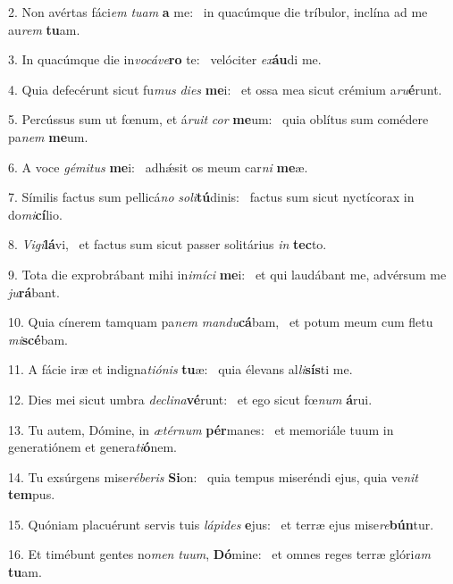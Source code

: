 2. Non avértas fáci\textit{em} \textit{tu}\textit{am} \textbf{a} me: \ast\  in quacúmque die tríbulor, inclína ad me au\textit{rem} \textbf{tu}am.\

3. In quacúmque die in\textit{vo}\textit{cá}\textit{ve}\textbf{ro} te: \ast\  velóciter \textit{ex}\textbf{áu}di me.\

4. Quia defecérunt sicut fu\textit{mus} \textit{di}\textit{es} \textbf{me}i: \ast\  et ossa mea sicut crémium a\textit{ru}\textbf{é}runt.\

5. Percússus sum ut fœnum, et á\textit{ru}\textit{it} \textit{cor} \textbf{me}um: \ast\  quia oblítus sum comédere pa\textit{nem} \textbf{me}um.\

6. A voce \textit{gé}\textit{mi}\textit{tus} \textbf{me}i: \ast\  adhǽsit os meum car\textit{ni} \textbf{me}æ.\

7. Símilis factus sum pellicá\textit{no} \textit{so}\textit{li}\textbf{tú}dinis: \ast\  factus sum sicut nyctícorax in do\textit{mi}\textbf{cí}lio.\

8. \textit{Vi}\textit{gi}\textbf{lá}vi, \ast\  et factus sum sicut passer solitárius \textit{in} \textbf{tec}to.\

9. Tota die exprobrábant mihi in\textit{i}\textit{mí}\textit{ci} \textbf{me}i: \ast\  et qui laudábant me, advérsum me \textit{ju}\textbf{rá}bant.\

10. Quia cínerem tamquam pa\textit{nem} \textit{man}\textit{du}\textbf{cá}bam, \ast\  et potum meum cum fletu \textit{mi}\textbf{scé}bam.\

11. A fácie iræ et indigna\textit{ti}\textit{ó}\textit{nis} \textbf{tu}æ: \ast\  quia élevans al\textit{li}\textbf{sís}ti me.\

12. Dies mei sicut umbra \textit{de}\textit{cli}\textit{na}\textbf{vé}runt: \ast\  et ego sicut fœ\textit{num} \textbf{á}rui.\

13. Tu autem, Dómine, in \textit{æ}\textit{tér}\textit{num} \textbf{pér}manes: \ast\  et memoriále tuum in generatiónem et genera\textit{ti}\textbf{ó}nem.\

14. Tu exsúrgens mise\textit{ré}\textit{be}\textit{ris} \textbf{Si}on: \ast\  quia tempus miseréndi ejus, quia ve\textit{nit} \textbf{tem}pus.\

15. Quóniam placuérunt servis tuis \textit{lá}\textit{pi}\textit{des} \textbf{e}jus: \ast\  et terræ ejus mise\textit{re}\textbf{bún}tur.\

16. Et timébunt gentes no\textit{men} \textit{tu}\textit{um}, \textbf{Dó}mine: \ast\  et omnes reges terræ glóri\textit{am} \textbf{tu}am.\

